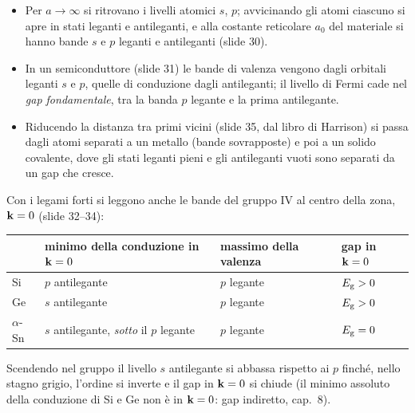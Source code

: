 \documentclass[11pt,a4paper]{article}
\begin{document}
\begin{itemize}[leftmargin=*]
\item Per $a\to\infty$ si ritrovano i livelli atomici $s$, $p$; avvicinando gli atomi ciascuno si apre in stati leganti e antileganti, e alla costante
reticolare $a_0$ del materiale si hanno bande $s$ e $p$ leganti e antileganti (slide 30).
\item In un semiconduttore (slide 31) le bande di valenza vengono dagli orbitali leganti $s$ e $p$, quelle di conduzione dagli antileganti; il livello
di Fermi cade nel \emph{gap fondamentale}, tra la banda $p$ legante e la prima antilegante.
\item Riducendo la distanza tra primi vicini (slide 35, dal libro di Harrison) si passa dagli atomi separati a un metallo (bande sovrapposte) e poi a
un solido covalente, dove gli stati leganti pieni e gli antileganti vuoti sono separati da un gap che cresce.
\end{itemize}
Con i legami forti si leggono anche le bande del gruppo IV al centro della zona, $\mathbf k=0$ (slide 32--34):
\begin{center}\small
\begin{tabular}{@{}llll@{}}
\toprule
& minimo della conduzione in $\mathbf k=0$ & massimo della valenza & gap in $\mathbf k=0$\\
\midrule
Si & $p$ antilegante & $p$ legante & $E_{\mathrm g}>0$\\
Ge & $s$ antilegante & $p$ legante & $E_{\mathrm g}>0$\\
$\alpha$-Sn & $s$ antilegante, \emph{sotto} il $p$ legante & $p$ legante & $E_{\mathrm g}=0$\\
\bottomrule
\end{tabular}
\end{center}
Scendendo nel gruppo il livello $s$ antilegante si abbassa rispetto ai $p$ finché, nello stagno grigio, l'ordine si inverte e il gap in $\mathbf k=0$ si chiude
(il minimo assoluto della conduzione di Si e Ge non è in $\mathbf k=0$: gap indiretto, cap.~8).
\end{document}
